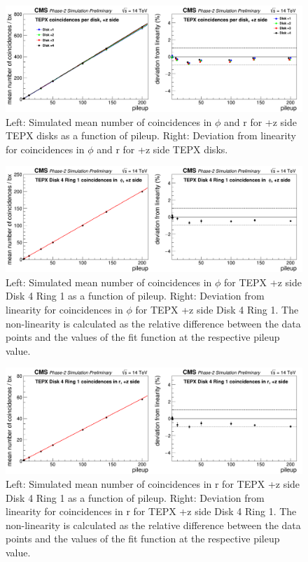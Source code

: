 \begin{figure}[H]
  \centering
  \includegraphics[width=1\columnwidth]{./coincidencesperdisk+z.png}
  \caption{Left: Simulated mean number of coincidences in $\phi$ and r for +z side TEPX disks as a function of pileup. Right: Deviation from linearity for coincidences in $\phi$ and r for +z side TEPX disks.}
  \label{fig:CMS}
\end{figure}







\begin{figure}[H]
  \centering
  \includegraphics[width=1\columnwidth]{./coincidencesinphiD4R1z+.png}
  \caption{Left: Simulated mean number of coincidences in $\phi$ for TEPX +z side Disk 4 Ring 1 as a function of pileup. Right: Deviation from linearity for coincidences in $\phi$ for TEPX +z side Disk 4 Ring 1. The non-linearity is calculated as the relative difference between the data points and the values of the fit function at the respective pileup value.}
  \label{fig:CMS}
\end{figure}



\begin{figure}[H]
  \centering
  \includegraphics[width=1\columnwidth]{./coincidencesinrD4R1z+.png}
  \caption{Left: Simulated mean number of coincidences in r for TEPX +z side Disk 4 Ring 1 as a function of pileup. Right: Deviation from linearity for coincidences in r for TEPX +z side Disk 4 Ring 1. The non-linearity is calculated as the relative difference between the data points and the values of the fit function at the respective pileup value.}
  \label{fig:CMS}
\end{figure}



